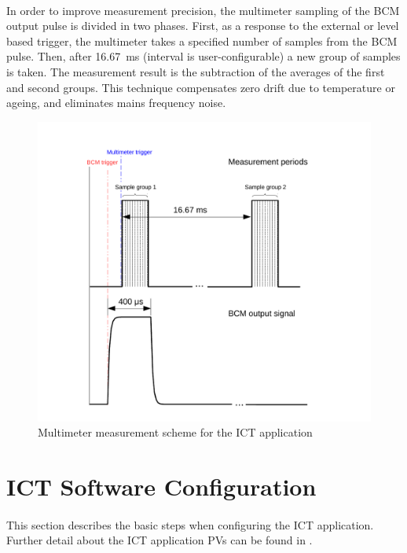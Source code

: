 \documentclass[openany]{article}
\begin{document}
	\paragraph{} In order to improve measurement precision, the multimeter sampling of the BCM output pulse is divided in two phases. First, as a response to the external or level based trigger, the multimeter takes a specified number of samples from the BCM pulse. Then, after \SI{16.67}{\milli\second} (interval is user-configurable) a new group of samples is taken. The measurement result is the subtraction of the averages of the first and second groups. This technique compensates zero drift due to temperature or ageing, and eliminates mains frequency noise.

	\begin{figure}[!h]
	\caption{Multimeter measurement scheme for the ICT application}
	\label{fig:meas-scheme}
	\centering
	\includegraphics[width=1.0\textwidth]{ict-meas-scheme-image}
	\end{figure}
\FloatBarrier

\section{ICT Software Configuration}

	\paragraph{} This section describes the basic steps when configuring the ICT application. Further detail about the ICT application PVs can be found in \emph{}.
\end{document}
